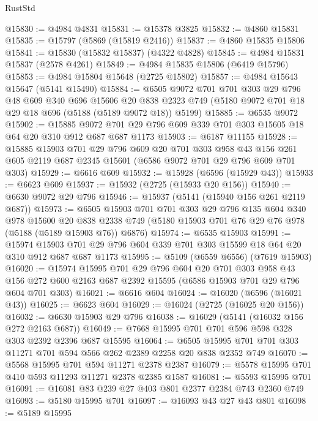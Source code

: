 \begin{lexlean}{RustStd}
\begin{coremodule}
@15830 := @4984 @4831
@15831 := @15378 @3825
@15832 := @4860 @15831
@15835 := @15797 (@5869 (@15819 @2416))
@15837 := @4860 @15835 @15806
@15841 := @15830 (@15832 @15837) (@4322 @4828)
@15845 := @4984 @15831 @15837 (@2578 @4261)
@15849 := @4984 @15835 @15806 (@6419 @15796)
@15853 := @4984 @15804 @15648 (@2725 @15802)
@15857 := @4984 @15643 @15647 (@5141 @15490)
@15884 := @6505
    @9072
    @701
    @701
    @303
    @29
    @796
    @48
    @609
    @340
    @696
    @15606
    @20
    @838
    @2323
    @749
    (@5180 @9072 @701 @18 @29 @18 @696 (@5188 (@5189 @9072 @18)) @5199)
@15885 := @6535 @9072
@15902 := @15885
    @9072
    @701
    @29
    @796
    @609
    @339
    @701
    @303
    @15605
    @18
    @64
    @20
    @310
    @912
    @687
    @687
    @1173
@15903 := @6187 @11155
@15928 := @15885
    @15903
    @701
    @29
    @796
    @609
    @20
    @701
    @303
    @958
    @43
    @156
    @261
    @605
    @2119
    @687
    @2345
    @15601
    (@6586 @9072 @701 @29 @796 @609 @701 @303)
@15929 := @6616 @609
@15932 := @15928 (@6596 (@15929 @43))
@15933 := @6623 @609
@15937 := @15932 (@2725 (@15933 @20 @156))
@15940 := @6630 @9072 @29 @796
@15946 := @15937 (@5141 (@15940 @156 @261 @2119 @687))
@15973 := @6505
    @15903
    @701
    @701
    @303
    @29
    @796
    @135
    @604
    @340
    @978
    @15600
    @20
    @838
    @2338
    @749
    (@5180 @15903 @701 @76 @29 @76 @978 (@5188 (@5189 @15903 @76)) @6876)
@15974 := @6535 @15903
@15991 := @15974
    @15903
    @701
    @29
    @796
    @604
    @339
    @701
    @303
    @15599
    @18
    @64
    @20
    @310
    @912
    @687
    @687
    @1173
@15995 := @5109 (@6559 @6556) (@7619 @15903)
@16020 := @15974
    @15995
    @701
    @29
    @796
    @604
    @20
    @701
    @303
    @958
    @43
    @156
    @272
    @600
    @2163
    @687
    @2392
    @15595
    (@6586 @15903 @701 @29 @796 @604 @701 @303)
@16021 := @6616 @604
@16024 := @16020 (@6596 (@16021 @43))
@16025 := @6623 @604
@16029 := @16024 (@2725 (@16025 @20 @156))
@16032 := @6630 @15903 @29 @796
@16038 := @16029 (@5141 (@16032 @156 @272 @2163 @687))
@16049 := @7668 @15995 @701 @701 @596 @598 @328 @303 @2392 @2396 @687 @15595
@16064 := @6505 @15995 @701 @701 @303 @11271 @701 @594 @566 @262 @2389 @2258 @20 @838 @2352 @749
@16070 := @5568 @15995 @701 @594 @11271 @2378 @2387
@16079 := @5578 @15995 @701 @410 @593 @11293 @11271 @2378 @2385 @1587
@16081 := @5593 @15995 @701
@16091 := @16081 @83 @239 @27 @403 @801 @2377 @2384 @743 @2360 @749
@16093 := @5180 @15995 @701
@16097 := @16093 @43 @27 @43 @801
@16098 := @5189 @15995

\end{coremodule}
\end{lexlean}
